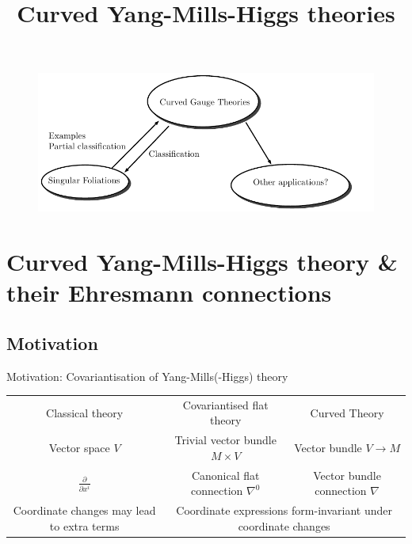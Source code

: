 \documentclass[
aspectratio=3218, 
10pt
]{beamer}
\title{Curved Yang-Mills-Higgs theories}
\subtitle{}
\author{Simon-Raphael Fischer, \textit{based on joint works with Camille Laurent-Gengoux, and with Mehran Jalali Farahani, Hyungrok Kim (\begin{CJK*}{UTF8}{bkai}金炯錄\end{CJK*}), Christian Sämann}}
\institute{
\begin{figure}
	\centering
		\texttt{[image: Logo\_Uni\_Göttingen\_2022.png]}
	\label{fig:NCTS}
\end{figure}
\begin{center}
\end{center}
}
\date{}
\theoremstyle{plain}
\theoremstyle{remark}
\begin{document}
\begin{frame}
\thispagestyle{empty}
\titlepage
\end{frame} 


{
\begin{frame}
\thispagestyle{empty}
\begin{figure}[htbp]
	\centering
		\includegraphics[width=1\textwidth]{Research circles I.pdf}
\end{figure}
\end{frame} 
}

\section{Curved Yang-Mills-Higgs theory \& their Ehresmann connections}

\subsection{Motivation}



\begin{frame}{Motivation: Covariantisation of Yang-Mills(-Higgs) theory}
{\renewcommand{\arraystretch}{2}
\begin{table}[h!]
		\begin{tabularx}{\textwidth}{c c c}
			\rowcolor{gray}
			Classical theory & Covariantised flat theory & Curved Theory \\
			Vector space $V$ & Trivial vector bundle $M \times V$ & Vector bundle $V \to M$ \\
			\rowcolor{Gray}
			$\frac{\partial}{\partial x^i}$ & Canonical flat connection $\nabla^0$ & Vector bundle connection $\nabla$ \\ 
			\multicolumn{1}{X}{Coordinate changes may lead to extra terms} & 
			\multicolumn{2}{c}{Coordinate expressions form-invariant under coordinate changes}
		\end{tabularx}
\end{table}}
\vspace{-30pt}
 \end{frame}
\end{document}

